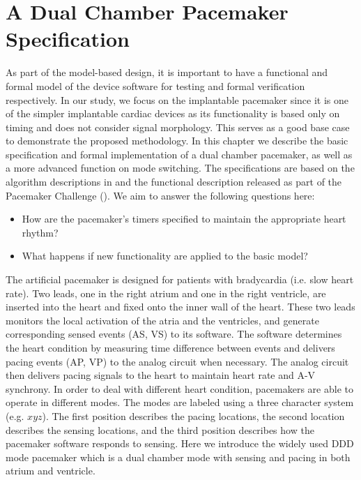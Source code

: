 \chapter{A Dual Chamber Pacemaker Specification}

As part of the model-based design, it is important to have a functional and formal model of the device software for testing and formal verification respectively. In our study, we focus on the implantable  pacemaker since it is one of the simpler implantable cardiac devices as its functionality is based only on timing and does not consider signal morphology. This serves as a good base case to demonstrate the proposed methodology.  In this chapter we describe the basic specification and formal implementation of a dual chamber pacemaker, as well as a more advanced function on mode switching. The specifications are based on the algorithm descriptions in \cite{compass} and the functional description released as part of the Pacemaker Challenge (\cite{challenge}). 
We aim to answer the following questions here:
\begin{itemize}
	\vspace{-5pt}
	\item How are the pacemaker's timers specified to maintain the appropriate heart rhythm?
	\vspace{-5pt}
   	\item What happens if new functionality are applied to the basic model?
\end{itemize}

The artificial pacemaker is designed for patients with bradycardia (i.e. slow heart rate). Two leads, one in the right atrium and one in the right ventricle, are inserted into the heart and fixed onto the inner wall of the heart. These two leads monitors the local activation of the atria and the ventricles, and generate corresponding sensed events (AS, VS) to its software. The software determines the heart condition by measuring time difference between events and delivers pacing events (AP, VP) to the analog circuit when necessary. The analog circuit then delivers pacing signals to the heart to maintain heart rate and A-V synchrony. In order to deal with different heart condition, pacemakers are able to operate in different modes. The modes are labeled using a three character system (e.g. $xyz$). The first position describes the pacing locations, the second location describes the sensing locations, and the third position describes how the pacemaker software responds to sensing. Here we introduce the widely used DDD mode pacemaker which is a dual chamber mode with sensing and pacing in both atrium and ventricle. 


